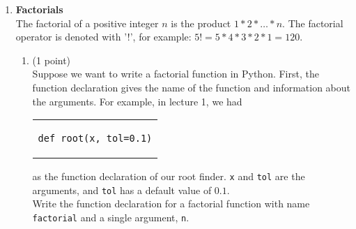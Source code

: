 \documentclass{article}
\newcounter{points}
\newcommand\setpoint{\addtocounter{points}{1}(1 point)}
\begin{document}
\begin{enumerate}
\begin{enumerate}
\setcounter{enumii}{1}
\item \setpoint \\
Describe an abstraction that can be made for this function.  For example, in lecture, we changed our $\sqrt{7}$ function to a $\sqrt{x}$ function.
\end{enumerate}

\begin{enumerate}
\setcounter{enumii}{2}
\item \setpoint \\
Suppose that your abstraction from part (b) is implemented.  What function call can you make so that the function returns the same value as it would have before the abstraction was implemented?  For example, in lecture, we could make the call \texttt{root(7)}.
\end{enumerate}

\begin{enumerate}
\setcounter{enumii}{3}
\item \setpoint \\
Does your \texttt{errorcheck()} implementation in part (a) still make sense?
\end{enumerate}


\item \textbf{Factorials} \\
The factorial of a positive integer $n$ is the product $1 * 2 * \hdots * n$.  The factorial operator is denoted with '!', for example: $5! = 5 * 4 * 3 * 2 * 1 = 120$.

\begin{enumerate}
\item \setpoint \\
Suppose we want to write a factorial function in Python.  First, the function declaration gives the name of the function and information about the arguments.  For example, in lecture 1, we had

\begin{tabular}{c}
\begin{lstlisting}
def root(x, tol=0.1)
\end{lstlisting}
\end{tabular}

as the function declaration of our root finder.  \texttt{x} and \texttt{tol} are the arguments, and \texttt{tol} has a default value of $0.1$. \\

Write the function declaration for a factorial function with name \texttt{factorial} and a single argument, \texttt{n}.
\end{enumerate}


\end{enumerate}
\end{document}
